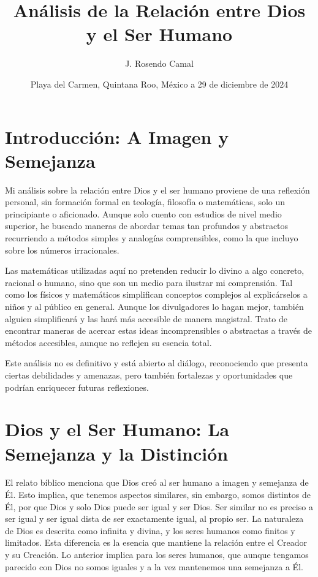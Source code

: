 \documentclass[letterpaper,13pt]{article}
\title{Análisis de la Relación entre Dios y el Ser Humano} %
\author{J. Rosendo Camal} %
\date{Playa del Carmen, Quintana Roo, México a 29 de diciembre de 2024} %
\begin{document}
\maketitle  %

\section{Introducción: A Imagen y Semejanza}

Mi análisis sobre la relación entre Dios y el ser humano proviene de una reflexión personal, sin formación formal en teología, filosofía o matemáticas, solo un principiante o aficionado. Aunque solo cuento con estudios de nivel medio superior, he buscado maneras de abordar temas tan profundos y abstractos recurriendo a métodos simples y analogías comprensibles, como la que incluyo sobre los números irracionales.

Las matemáticas utilizadas aquí no pretenden reducir lo divino a algo concreto, racional o humano, sino que son un medio para ilustrar mi comprensión. Tal como los físicos y matemáticos simplifican conceptos complejos al explicárselos a niños y al público en general. Aunque los divulgadores lo hagan mejor, también alguien simplificará y las hará más accesible de manera magistral. Trato de encontrar maneras de acercar estas ideas incomprensibles o abstractas a través de métodos accesibles, aunque no reflejen su esencia total.

Este análisis no es definitivo y está abierto al diálogo, reconociendo que presenta ciertas debilidades y amenazas, pero también fortalezas y oportunidades que podrían enriquecer futuras reflexiones.

\section{Dios y el Ser Humano: La Semejanza y la Distinción}

El relato bíblico menciona que Dios creó al ser humano a imagen y semejanza de Él. Esto implica, que tenemos aspectos similares, sin embargo, somos distintos de Él, por que Dios y solo Dios puede ser igual y ser Dios. Ser similar no es preciso a ser igual y ser igual dista de ser exactamente igual, al propio ser. La naturaleza de Dios es descrita como infinita y divina, y los seres humanos como finitos y limitados. Esta diferencia es la esencia que mantiene la relación entre el Creador y su Creación. Lo anterior implica para los seres humanos, que aunque tengamos parecido con Dios no somos iguales y a la vez mantenemos una semejanza a Él.
\end{document}
